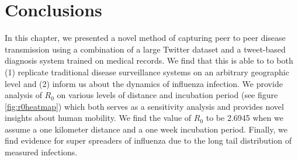 \section{Conclusions}
In this chapter, we presented a novel method of capturing peer to peer disease transmission using a combination of a large Twitter dataset and a tweet-based diagnosis system trained on medical records. We find that this is able to to both (1) replicate traditional disease surveillance systems on an arbitrary geographic level and (2) inform us about the dynamics of influenza infection. We provide analysis of \(R_0\) on various levels of distance and incubation period (see figure \ref{fig:r0heatmap}) which both serves as a sensitivity analysis and provides novel insights about human mobility. We find the value of \(R_0\) to be 2.6945 when we assume a one kilometer distance and a one week incubation period. Finally, we find evidence for super spreaders of influenza due to the long tail distribution of measured infections.%

